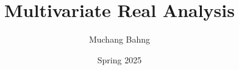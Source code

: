 \documentclass{article}
\begin{document}
\title{Multivariate Real Analysis}
\author{Muchang Bahng}
\date{Spring 2025}

\maketitle
\tableofcontents
\pagebreak










\end{document}

